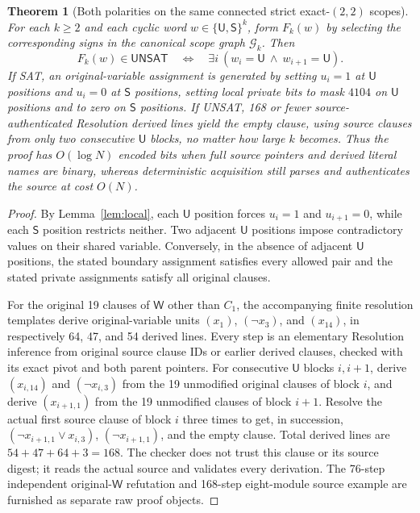 \documentclass[11pt]{article}
\newtheorem{theorem}{Theorem}
\newcommand{\UNSAT}{\mathsf{UNSAT}}
\newcommand{\W}{\mathsf{W}}
\newcommand{\U}{\mathsf{U}}
\newcommand{\V}{\mathsf{S}}
\begin{document}
\begin{theorem}[Both polarities on the same connected strict exact-$(2,2)$ scopes]\label{thm:two}
For each $k\ge2$ and each cyclic word $w\in\{\U,\V\}^k$, form $F_k(w)$ by selecting the corresponding signs in the canonical scope graph $\mathcal G_k$. Then
\[
 \boxed{F_k(w)\in\UNSAT\quad\Longleftrightarrow\quad
 \exists i\ (w_i=\U\ \wedge\ w_{i+1}=\U)}.
\]
If SAT, an original-variable assignment is generated by setting $u_i=1$ at $\U$ positions and $u_i=0$ at $\V$ positions, setting local private bits to mask $4104$ on $\U$ positions and to zero on $\V$ positions. If UNSAT, 168 or fewer source-authenticated Resolution derived lines yield the empty clause, using source clauses from only two consecutive $\U$ blocks, no matter how large $k$ becomes. Thus the proof has $O(\log N)$ encoded bits when full source pointers and derived literal names are binary, whereas deterministic acquisition still parses and authenticates the source at cost $O(N)$.
\end{theorem}
\begin{proof}
By Lemma~\ref{lem:local}, each $\U$ position forces $u_i=1$ and $u_{i+1}=0$, while each $\V$ position restricts neither. Two adjacent $\U$ positions impose contradictory values on their shared variable. Conversely, in the absence of adjacent $\U$ positions, the stated boundary assignment satisfies every allowed pair and the stated private assignments satisfy all original clauses.

For the original 19 clauses of $\W$ other than $C_1$, the accompanying finite resolution templates derive original-variable units $(x_1)$, $(\neg x_3)$, and $(x_{14})$, in respectively 64, 47, and 54 derived lines. Every step is an elementary Resolution inference from original source clause IDs or earlier derived clauses, checked with its exact pivot and both parent pointers. For consecutive $\U$ blocks $i,i+1$, derive $(x_{i,14})$ and $(\neg x_{i,3})$ from the 19 unmodified original clauses of block $i$, and derive $(x_{i+1,1})$ from the 19 unmodified clauses of block $i+1$. Resolve the actual first source clause of block $i$ three times to get, in succession, $(\neg x_{i+1,1}\vee x_{i,3})$, $(\neg x_{i+1,1})$, and the empty clause. Total derived lines are $54+47+64+3=168$. The checker does not trust this clause or its source digest; it reads the actual source and validates every derivation. The 76-step independent original-$\W$ refutation and 168-step eight-module source example are furnished as separate raw proof objects.
\end{proof}
\end{document}
